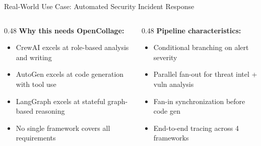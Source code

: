 \begin{frame}{\fontsize{10}{12}\selectfont Real-World Use Case: Automated Security Incident Response}
\begin{center}
  \end{center}

  \vspace{0.1cm}

  \fontsize{6}{7}\selectfont
  \begin{columns}[T]
    \begin{column}{0.48\textwidth}
      \textbf{Why this needs OpenCollage:}
      \begin{itemize}
        \item CrewAI excels at role-based analysis and writing
        \item AutoGen excels at code generation with tool use
        \item LangGraph excels at stateful graph-based reasoning
        \item No single framework covers all requirements
      \end{itemize}
    \end{column}
    \begin{column}{0.48\textwidth}
      \textbf{Pipeline characteristics:}
      \begin{itemize}
        \item Conditional branching on alert severity
        \item Parallel fan-out for threat intel + vuln analysis
        \item Fan-in synchronization before code gen
        \item End-to-end tracing across 4 frameworks
      \end{itemize}
    \end{column}
  \end{columns}
\end{frame}
